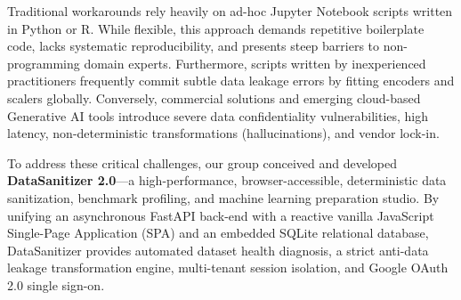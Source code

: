 Traditional workarounds rely heavily on ad-hoc Jupyter Notebook scripts written in Python or R. While flexible, this approach demands repetitive boilerplate code, lacks systematic reproducibility, and presents steep barriers to non-programming domain experts. Furthermore, scripts written by inexperienced practitioners frequently commit subtle data leakage errors by fitting encoders and scalers globally. Conversely, commercial solutions and emerging cloud-based Generative AI tools introduce severe data confidentiality vulnerabilities, high latency, non-deterministic transformations (hallucinations), and vendor lock-in.

To address these critical challenges, our group conceived and developed \textbf{DataSanitizer 2.0}—a high-performance, browser-accessible, deterministic data sanitization, benchmark profiling, and machine learning preparation studio. By unifying an asynchronous FastAPI back-end with a reactive vanilla JavaScript Single-Page Application (SPA) and an embedded SQLite relational database, DataSanitizer provides automated dataset health diagnosis, a strict anti-data leakage transformation engine, multi-tenant session isolation, and Google OAuth 2.0 single sign-on.

